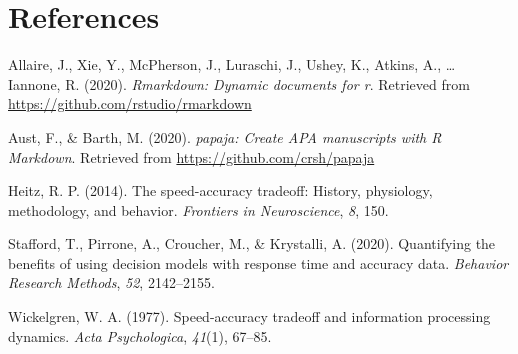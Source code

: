 \documentclass[
  english,
  ,jou,floatsintext]{apa6}
\begin{document}
\hypertarget{references}{%
\section*{References}\label{references}}

\hypertarget{refs}{}
\leavevmode\hypertarget{ref-rmarkdowncite}{}%
Allaire, J., Xie, Y., McPherson, J., Luraschi, J., Ushey, K., Atkins, A., \ldots{} Iannone, R. (2020). \emph{Rmarkdown: Dynamic documents for r}. Retrieved from \url{https://github.com/rstudio/rmarkdown}

\leavevmode\hypertarget{ref-aust2020}{}%
Aust, F., \& Barth, M. (2020). \emph{papaja: Create APA manuscripts with R Markdown}. Retrieved from \url{https://github.com/crsh/papaja}

\leavevmode\hypertarget{ref-heitz2014speed}{}%
Heitz, R. P. (2014). The speed-accuracy tradeoff: History, physiology, methodology, and behavior. \emph{Frontiers in Neuroscience}, \emph{8}, 150.

\leavevmode\hypertarget{ref-stafford2020}{}%
Stafford, T., Pirrone, A., Croucher, M., \& Krystalli, A. (2020). Quantifying the benefits of using decision models with response time and accuracy data. \emph{Behavior Research Methods}, \emph{52}, 2142--2155.

\leavevmode\hypertarget{ref-wickelgren1977speed}{}%
Wickelgren, W. A. (1977). Speed-accuracy tradeoff and information processing dynamics. \emph{Acta Psychologica}, \emph{41}(1), 67--85.
\end{document}
